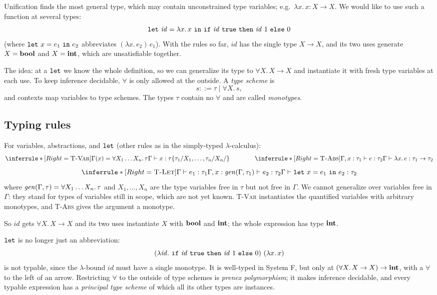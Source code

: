 Unification finds the most general type, which may contain unconstrained type
variables; e.g.\ $\lambda x.\, x : X \to X$. We would like to use such a function at
several types:
\[
\ttkw{let}\ \mathit{id} = \lambda x.\, x\ \ttkw{in}\ \ttkw{if}\ \mathit{id}\ \ttkw{true}\ \ttkw{then}\ \mathit{id}\ 1\ \ttkw{else}\ 0
\]
(where $\mathtt{let}\ x = e_1\ \mathtt{in}\ e_2$ abbreviates $(\lambda x.\, e_2)\, e_1$).
With the rules so far, $\mathit{id}$ has the single type $X \to X$, and its two uses
generate $X = \mathbf{bool}$ and $X = \mathbf{int}$, which are unsatisfiable together.

The idea: at a $\mathtt{let}$ we know the whole definition, so we can generalize its
type to $\forall X.\, X \to X$ and instantiate it with fresh type variables at each
use. To keep inference decidable, $\forall$ is only allowed at the outside. A
\emph{type scheme} is
\[
s ::= \tau \mid \forall X.\, s,
\]
and contexts map variables to type schemes. The types $\tau$ contain no $\forall$ and
are called \emph{monotypes}.

\subsection{Typing rules}

For variables, abstractions, and $\mathtt{let}$ (other rules as in the simply-typed
$\lambda$-calculus):
\[
\inferrule*[Right=\textsc{T-Var}]
  {\Gamma(x) = \forall X_1 \ldots X_n.\, \tau}
  {\Gamma \vdash x : \tsub{\tau}{\tau_1/X_1, \ldots, \tau_n/X_n}{}}
\qquad \qquad
\inferrule*[Right=\textsc{T-Abs}]
  {\Gamma, x : \tau_1 \vdash e : \tau_2}
  {\Gamma \vdash \lambda x.\, e : \tau_1 \to \tau_2}
\]
\[
\inferrule*[Right=\textsc{T-Let}]
  {\Gamma \vdash e_1 : \tau_1 \\ \Gamma, x : \gen(\Gamma, \tau_1) \vdash e_2 : \tau_2}
  {\Gamma \vdash \ttkw{let}\ x = e_1\ \ttkw{in}\ e_2 : \tau_2}
\]
where $\mathit{gen}(\Gamma, \tau) = \forall X_1 \ldots X_n.\, \tau$ and $X_1, \ldots, X_n$ are
the type variables free in $\tau$ but not free in $\Gamma$. We cannot generalize over
variables free in $\Gamma$: they stand for types of variables still in scope, which
are not yet known. \textsc{T-Var} instantiates the quantified variables with
arbitrary monotypes, and \textsc{T-Abs} gives the argument a monotype.

So $\mathit{id}$ gets $\forall X.\, X \to X$ and its two uses instantiate $X$ with
$\mathbf{bool}$ and $\mathbf{int}$; the whole expression has type $\mathbf{int}$.

$\mathtt{let}$ is no longer just an abbreviation:
\[
(\lambda \mathit{id}.\ \ttkw{if}\ \mathit{id}\ \ttkw{true}\ \ttkw{then}\ \mathit{id}\ 1\ \ttkw{else}\ 0)\ (\lambda x.\, x)
\]
is not typable, since the $\lambda$-bound $\mathit{id}$ must have a single monotype.
It is well-typed in System F, but only at $(\forall X.\, X \to X) \to \mathbf{int}$,
with a $\forall$ to the left of an arrow. Restricting $\forall$ to the outside of
type schemes is \emph{prenex polymorphism}; it makes inference decidable, and every
typable expression has a \emph{principal type scheme} of which all its other types are
instances.

